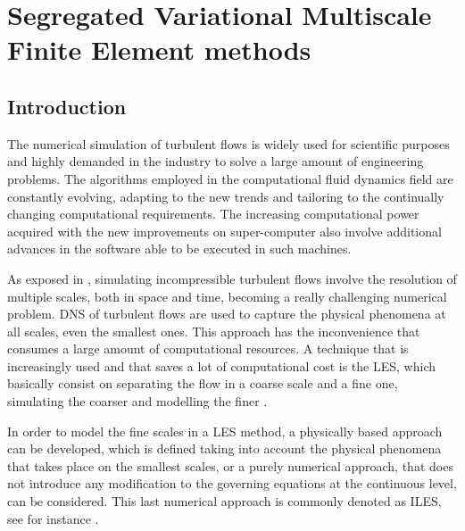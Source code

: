 \chapter{Segregated Variational Multiscale Finite Element methods}
\label{chap-SVMS}

\section{Introduction}
\label{sec-C7_intro}

The numerical simulation of turbulent flows is widely used for scientific purposes and highly demanded in the industry to solve a large amount of engineering problems. The algorithms employed in the computational fluid dynamics field are constantly evolving, adapting to the new trends and tailoring to the continually changing computational requirements. The increasing computational power acquired with the new improvements on super-computer also involve additional advances in the software able to be executed in such machines.

As exposed in , simulating incompressible turbulent flows involve the resolution of multiple scales, both in space and time, becoming a really challenging numerical problem. DNS of turbulent flows are used to capture the physical phenomena at all scales, even the smallest ones. This approach has the inconvenience that consumes a large amount of computational resources. A technique that is increasingly used and that saves a lot of computational cost is the LES, which basically consist on separating the flow in a coarse scale and a fine one, simulating the coarser and modelling the finer \cite{sagaut_large_2000}. 

In order to model the fine scales in a LES method, a physically based approach can be developed, which is defined taking into account the physical phenomena that takes place on the smallest scales, or a purely numerical approach, that does not introduce any modification to the governing equations at the continuous level, can be considered. This last numerical approach is commonly denoted as ILES, see for instance \cite{boris_new_1992}.

